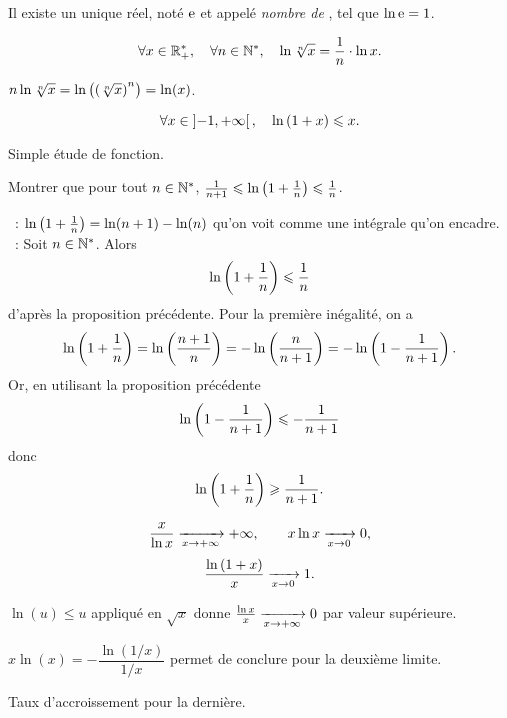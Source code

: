 \documentclass{magnolia}
\begin{document}
\begin{definition}[utile=-3]
Il existe un unique réel, noté ${\rm e}$ et appelé \emph{nombre de }, tel que $\ln {\rm e}=1$.
\end{definition}

\begin{proposition}[utile=-3]
\[\forall x\in\mathbb{R}_+^* ,\quad \forall n\in{\mathbb{N}^*} ,\quad
  \ln\sqrt[n]{x}=\frac{1}{n}\cdot\ln x.\]
\end{proposition}

\begin{preuve}
$n\ln\sqrt[n]{x}=\ln\left(\left(\sqrt[n]{x}\right)^{n}\right)=\ln(x)$.
\end{preuve}


\begin{proposition}[utile=-3]
\[\forall x\in\left]-1,+\infty\right[ ,\quad \ln\left(1+x\right)\leqslant x.\]  
\end{proposition}

\begin{preuve}
Simple étude de fonction.
\end{preuve}


\begin{exoUnique}
\exemple Montrer que pour tout $n\in{\mathbb{N}^*}$,
  $\frac{1}{n+1}\leqslant\ln\left(1+\frac{1}{n}\right)\leqslant\frac{1}{n}$.
\end{exoUnique}

\begin{sol}
~: $\ln\left(1+\frac{1}{n}\right)=\ln(n+1)-\ln(n)$ qu'on voit comme une intégrale qu'on encadre.\\
~: Soit $n\in{\mathbb{N}^*}$. Alors
\[\ln\left(1+\frac{1}{n}\right)\leqslant\frac{1}{n}\]
d'après la proposition précédente. Pour la première inégalité, on a
\[\ln\left(1+\frac{1}{n}\right)=\ln\left(\frac{n+1}{n}\right)=-\ln\left(\frac{n}{n+1}\right)=-\ln\left(1-\frac{1}{n+1}\right).\]
Or, en utilisant la proposition précédente
\[\ln\left(1-\frac{1}{n+1}\right)\leqslant -\frac{1}{n+1}\]
donc
\[\ln\left(1+\frac{1}{n}\right)\geqslant\frac{1}{n+1}.\]
\end{sol}

\begin{proposition}[utile=-3]
\[\frac{x}{\ln x}\xrightarrow[x\rightarrow +\infty]{} +\infty, \qquad
  x\ln x\xrightarrow[x\rightarrow 0]{} 0,\]
\[\frac{\ln\left(1+x\right)}{x} \xrightarrow[x\rightarrow 0]{} 1.\]  
\end{proposition}

\begin{preuve}
$\ln(u)\leq u$ appliqué en $\sqrt{x}$ donne $\frac{\ln x}{x}\xrightarrow[x\rightarrow +\infty]{} 0$ par valeur supérieure.

$x\ln(x)=-\dfrac{\ln(1/x)}{1/x}$ permet de conclure pour la deuxième limite.

Taux d'accroissement pour la dernière.

\end{preuve}
\end{document}
